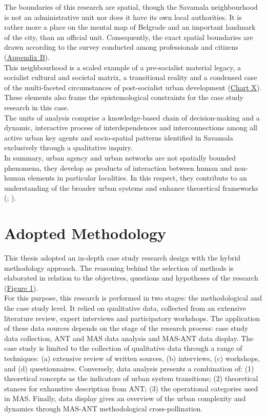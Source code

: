 \documentclass[11pt]{report}
\begin{document}
The boundaries of this research are spatial, though the Savamala neighbourhood is not an administrative unit nor does it have its own local authorities. It is rather more a place on the mental map of Belgrade and an important landmark of the city, than an official unit. Consequently, the exact spatial boundaries are drawn according to the survey conducted among professionals and citizens (\href{Appendix}{Appendix B}).
\\

This neighbourhood is a scaled example of a pre-socialist material legacy, a socialist cultural and societal matrix, a transitional reality and a condensed case of the multi-faceted circumstances of post-socialist urban development (\href{Table space-time}{Chart X}). These elements also frame the epistemological constraints for the case study research in this case.
\\

The units of analysis comprise a knowledge-based chain of decision-making and a dynamic, interactive process of interdependences and interconnections among all active urban key agents and socio-spatial patterns identified in Savamala exclusively through a qualitative inquiry.
\\

In summary, urban agency and urban networks are not spatially bounded phenomena, they develop as products of interaction between human and non-human elements in particular localities. In this respect, they contribute to an understanding of the broader urban systems and enhance theoretical frameworks (\href{Giddens}{\citealt{giddens_constitution_1984}}; \href{Grubovic}{\citealt{grubovic_belgrade_2006}}).

\section{Adopted Methodology}

This thesis adopted an in-depth case study research design with the hybrid methodology approach. The reasoning behind the selection of methods is elaborated in relation to the objectives, questions and hypotheses of the research (\href{ref}{Figure 1}).  
\\

For this purpose, this research is performed in two stages: the methodological and the case study level. It relied on qualitative data, collected from an extensive literature review, expert interviews and participatory workshops. The application of these data sources depends on the stage of the research process: case study data collection, ANT and MAS data analysis and MAS-ANT data display. The case study is limited to the collection of qualitative data through a range of techniques:  (a) extensive review of written sources, (b) interviews,
(c) workshops, and (d) questionnaires. Conversely, data analysis presents a combination of: (1) theoretical concepts as the indicators of urban system transitions; (2) theoretical stances for exhaustive description from ANT; (3) the operational categories used in MAS. Finally, data display gives an overview of the urban complexity and dynamics through MAS-ANT methodological cross-pollination.
\\
\end{document}
